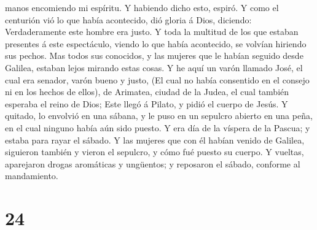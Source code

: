 manos encomiendo mi espíritu. Y habiendo dicho esto, espiró.
 Y como el centurión vió lo que había acontecido, dió
gloria á Dios, diciendo: Verdaderamente este hombre era justo.
 Y toda la multitud de los que estaban presentes á este
espectáculo, viendo lo que había acontecido, se volvían hiriendo sus
pechos.  Mas todos sus conocidos, y las mujeres que le
habían seguido desde Galilea, estaban lejos mirando estas cosas.
 Y he aquí un varón llamado José, el cual era senador,
varón bueno y justo,  (El cual no había consentido en el
consejo ni en los hechos de ellos), de Arimatea, ciudad de la Judea, el
cual también esperaba el reino de Dios;  Este llegó á
Pilato, y pidió el cuerpo de Jesús.  Y quitado, lo envolvió
en una sábana, y le puso en un sepulcro abierto en una peña, en el cual
ninguno había aún sido puesto.  Y era día de la víspera de
la Pascua; y estaba para rayar el sábado.  Y las mujeres
que con él habían venido de Galilea, siguieron también y vieron el
sepulcro, y cómo fué puesto su cuerpo.  Y vueltas,
aparejaron drogas aromáticas y ungüentos; y reposaron el sábado,
conforme al mandamiento.

\hypertarget{section-23}{%
\section{24}\label{section-23}}

